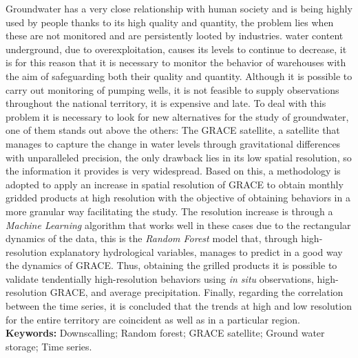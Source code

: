 Groundwater has a very close relationship with human society and is being highly used by people thanks to its
high quality and quantity, the problem lies when these are not monitored and are persistently looted by industries. water content
underground, due to overexploitation, causes its levels to continue to decrease, it is for this reason that it is necessary to monitor the behavior of
warehouses with the aim of safeguarding both their quality and quantity. Although it is possible to carry out monitoring of pumping wells, it is not
feasible to supply observations throughout the national territory, it is expensive and late. To deal with this problem it is necessary to look for new alternatives for the study of
groundwater, one of them stands out above the others: The GRACE satellite, a satellite that manages to capture the change in water levels through gravitational differences with unparalleled precision,
the only drawback lies in its low spatial resolution, so the information it provides is very
widespread. Based on this, a methodology is adopted to apply an increase in spatial resolution of GRACE to obtain monthly gridded products at high resolution with the
objective of obtaining behaviors in a more granular way facilitating the study. The resolution increase is through a \textit{Machine Learning} algorithm that works well in these cases
due to the rectangular dynamics of the data, this is the \textit{Random Forest} model that, through high-resolution explanatory hydrological variables, manages to predict in a good way
the dynamics of GRACE. Thus, obtaining the grilled products it is possible to validate tendentially
high-resolution behaviors using \textit{in situ} observations, high-resolution GRACE, and average precipitation.
Finally, regarding the correlation between the time series, it is concluded that the trends at high and low resolution for the entire territory are coincident as well as in a particular region.
\vskip 0.2in
\noindent
{\bf Keywords:} Downscalling; Random forest; GRACE satellite; Ground water storage; Time series.
